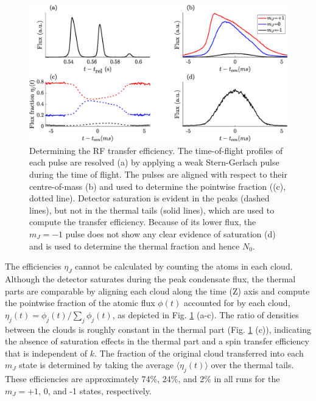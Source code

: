 	\begin{figure}
	\begin{center}
		\includegraphics[width=\columnwidth]{fig/depletion/frac_cal_profile.eps}
		\caption{Determining the RF transfer efficiency. The time-of-flight profiles of each pulse are resolved (a) by applying a weak Stern-Gerlach pulse during the time of flight. The pulses are aligned with respect to their centre-of-mass (b) and used to determine the pointwise fraction ((c), dotted line). Detector saturation is evident in the peaks (dashed lines), but not in the thermal tails (solid lines), which are used to compute the transfer efficiency. Because of its lower flux, the $m_J=-1$ pulse does not show any clear evidence of saturation (d) and is used to determine the thermal fraction and hence $N_0$.}
		\label{fig:frac_cal}
	\end{center}
	\end{figure}

	The efficiencies $\eta_J$ cannot be calculated by counting the atoms in each cloud. Although the detector saturates during the peak condensate flux, the thermal parts are comparable by aligning each cloud along the time (Z) axis and compute the pointwise fraction of the atomic flux $\phi(t)$ accounted for by each cloud, $\eta_j(t) = \phi_j(t)/\sum_j\phi_j(t)$, as depicted in Fig. \ref{fig:frac_cal} (a-c).
	The ratio of densities between the clouds is roughly constant in the thermal part (Fig. \ref{fig:frac_cal} (c)), indicating the absence of saturation effects in the thermal part and a spin transfer efficiency that is independent of $k$. 
	The fraction of the original cloud transferred into each $m_J$ state is determined by taking the average $\langle\eta_j(t)\rangle$ over the thermal tails. 
	These efficiencies are approximately 74\%, 24\%, and 2\% in all runs for the $m_J=+1$, 0, and -1 states, respectively.
	
